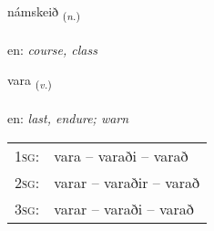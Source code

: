 \documentclass[frontgrid, backgrid]{flacards}\usepackage[]{graphicx}\usepackage[]{color}
\begin{document}
\renewcommand{\flhead}{\vskip5pt \fboxsep=0pt {\small\bfseries\footnotesize Nafnorð | Noun}}
\renewcommand{\fcfoot}{\vskip5pt \fboxsep=0pt \hspace{2pt}{\small\bfseries\footnotesize 2K}}

\renewcommand{\blhead}{\vskip5pt {\small\bfseries\footnotesize Nafnorð | Noun }}
\renewcommand{\bcfoot}{\vskip5pt \hspace{2pt}{\small\bfseries\footnotesize 2K}}


{námskeið \small{\textsubscript{(\textit{n.})}} \\[1ex] %
\textphonetic{[naumsceið]} \\
en: \emph{course, class} \\  [2ex]
\renewcommand*{\arraystretch}{0.8}
}

\renewcommand{\flhead}{\vskip5pt \fboxsep=0pt {\small\bfseries\footnotesize Sagnorð | Verb}}
\renewcommand{\fcfoot}{\vskip5pt \fboxsep=0pt \hspace{2pt}{\small\bfseries\footnotesize 2K}}

\renewcommand{\blhead}{\vskip5pt {\small\bfseries\footnotesize Sagnorð | Verb }}
\renewcommand{\bcfoot}{\vskip5pt \hspace{2pt}{\small\bfseries\footnotesize 2K}}


{vara \small{\textsubscript{(\textit{v.})}} \\[1ex] %
\textphonetic{[vaːra]} \\
en: \emph{last, endure; warn} \\  [2ex]
\renewcommand*{\arraystretch}{0.8}
\begin{tabular}{p{1cm}l}
\textsc{1sg}: & vara -- varaði -- varað \\ 
\textsc{2sg}: & varar -- varaðir -- varað \\ 
\textsc{3sg}: & varar -- varaði -- varað \\ 
\end{tabular}
}
\end{document}
